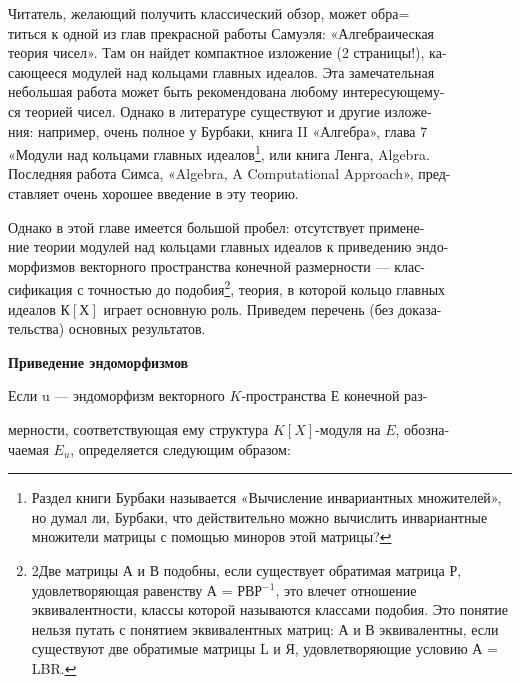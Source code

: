 \documentclass{../template/mai_book}
\begin{document}
Читатель, желающий получить классический обзор, может 
обра=\\титься к одной из глав прекрасной работы Самуэля: «Алгебраическая\\ 
теория чисел». Там он найдет компактное изложение (2 страницы!), 
ка-\\сающееся модулей над кольцами главных идеалов. Эта замечательная\\
небольшая работа может быть рекомендована любому 
интересующему-\\ся теорией чисел. Однако в литературе существуют и другие
изложе-\\ния: например, очень полное у Бурбаки, книга II «Алгебра», глава 7\\ 
«Модули над кольцами главных идеалов\footnote{Раздел книги Бурбаки называется «Вычисление инвариантных множителей», но 
думал ли, Бурбаки, что действительно можно вычислить инвариантные множители матрицы с помощью миноров этой матрицы? }, или книга Ленга, Algebra.\\ 
Последняя работа Симса, «Algebra, A Computational Approach», 
пред-\\ставляет очень хорошее введение в эту теорию. 


Однако в этой главе имеется большой пробел: отсутствует 
примене-\\ние теории модулей над кольцами главных идеалов к приведению 
эндо-\\морфизмов векторного пространства конечной размерности — 
клас-\\сификация с точностью до подобия\footnote{2Две матрицы А и В подобны, если существует обратимая матрица Р, 
удовлетворяющая равенству А = РВР$^{-1}$, это влечет отношение эквивалентности, классы 
которой называются классами подобия. Это понятие нельзя путать с понятием 
эквивалентных матриц: А и В эквивалентны, если существуют две обратимые матрицы 
L и Я, удовлетворяющие условию А = LBR.}, теория, в которой кольцо главных\\ идеалов $К[Х]$ играет основную роль. Приведем перечень (без 
доказа-\\тельства) основных результатов.

\medskip

{\noindent \bf Приведение эндоморфизмов} 

\medskip
Если u — эндоморфизм векторного $K$-пространства $Е$ конечной раз-


\pagebreak

\noindent мерности, соответствующая ему структура $K[X]$-модуля на $E$, 
обозна-\\чаемая $E_u$, определяется следующим образом: 
\end{document}
